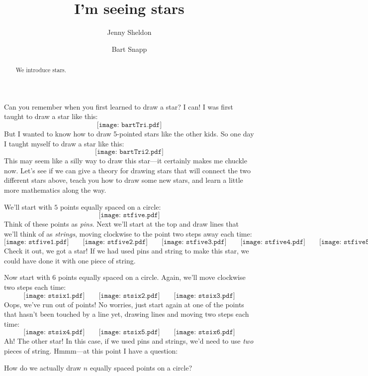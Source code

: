 \documentclass{ximera}
\author{Jenny Sheldon \and Bart Snapp}
\title{I'm seeing stars}
\begin{document}
\begin{abstract}
  We introduce stars.
\end{abstract}
\maketitle


Can you remember when you first learned to draw a star? I can! I was first taught to draw a star like this:
\[
\texttt{[image: bartTri.pdf]}
\]
But I wanted to know how to draw 5-pointed stars like the other
kids. So one day I taught myself to draw a star like this:
\[
\texttt{[image: bartTri2.pdf]}
\]
This may seem like a silly way to draw this star---it certainly makes
me chuckle now. Let's see if we can give a theory for drawing stars
that will connect the two different stars above, teach you how to
draw some new stars, and learn a little more mathematics along the
way.

We'll start with $5$ points equally spaced on a circle:
\[
\texttt{[image: stfive.pdf]}
\]
Think of these points as \textit{pins}.  Next we'll start at the top
and draw lines that we'll think of as \textit{strings}, moving
clockwise to the point two steps away each time:
\[
\texttt{[image: stfive1.pdf]}\qquad\texttt{[image: stfive2.pdf]}\qquad\texttt{[image: stfive3.pdf]}\qquad\texttt{[image: stfive4.pdf]}\qquad\texttt{[image: stfive5.pdf]}
\]
Check it out, we got a star! If we had used pins and string to make
this star, we could have done it with one piece of string.

Now start with $6$ points equally spaced on a circle. Again, we'll
move clockwise two steps each time:
\[
\texttt{[image: stsix1.pdf]}\qquad\texttt{[image: stsix2.pdf]}\qquad\texttt{[image: stsix3.pdf]}
\]
Oops, we've run out of points! No worries, just start again at one of
the points that hasn't been touched by a line yet, drawing lines and
moving two steps each time:
\[
\texttt{[image: stsix4.pdf]}\qquad\texttt{[image: stsix5.pdf]}\qquad\texttt{[image: stsix6.pdf]}
\]
Ah! The other star! In this case, if we used pins and strings, we'd
need to use \textit{two} pieces of string. Hmmm---at this point I have
a question:
\begin{question} 
How do we actually draw $n$ equally spaced points on a circle?
\end{question}
 
\end{document}
